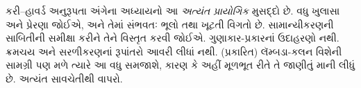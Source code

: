 \documentclass[../../../include/open-logic-chapter]{subfiles}
\begin{document}

\begin{editorial}
  કરી--હાવર્ડ અનુરૂપતા અંગેના અધ્યાયનો આ
  \emph{અત્યંત પ્રાયોગિક} મુસદ્દો છે.
  વધુ ખુલાસા અને પ્રેરણા જોઈએ, અને તેમાં
  સંભવતઃ ભૂલો તથા ખૂટતી વિગતો છે.
  સામાન્યીકરણની સાબિતીની સમીક્ષા કરીને
  તેને વિસ્તૃત કરવી જોઈએ. ગુણાકાર-પ્રકારનાં
  ઉદાહરણો નથી. ક્રમચય અને સરળીકરણનાં
  રૂપાંતરો આવરી લીધાં નથી. (પ્રકારિત)
  લૅમ્બડા-કલન વિશેની સામગ્રી પણ મળે
  ત્યારે આ વધુ સમજાશે, કારણ કે અહીં
  મૂળભૂત રીતે તે જાણીતું માની લીધું છે.
  અત્યંત સાવચેતીથી વાપરો.
\end{editorial}


\OLEndChapterHook
\end{document}
